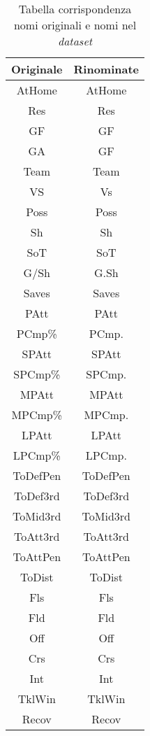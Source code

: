 \begin{table}[!htb]%
	
	\renewcommand{\arraystretch}{1.7}
	\centering
	\begin{tabular}{c c }
		\hline	
		
		\textbf{Originale} & \textbf{Rinominate} \\	
		\hline			
		AtHome & AtHome \\
		Res & Res \\
		GF & GF\\
		GA & GF \\
		Team & Team \\
		VS & Vs\\
		Poss & Poss\\
		Sh & Sh\\
		SoT & SoT\\
		G/Sh & G.Sh \\
		Saves & Saves \\
		PAtt & PAtt \\
		PCmp\% & PCmp.\\
		SPAtt & SPAtt \\
		SPCmp\% & SPCmp.\\
		MPAtt & MPAtt \\
		MPCmp\% & MPCmp.\\
		LPAtt & LPAtt \\
		LPCmp\% & LPCmp. \\
		ToDefPen & ToDefPen \\
		ToDef3rd & ToDef3rd \\
		ToMid3rd & ToMid3rd \\
		ToAtt3rd & ToAtt3rd \\
		ToAttPen & ToAttPen \\
		ToDist & ToDist\\
		Fls & Fls \\
		Fld & Fld \\
		Off & Off \\
		Crs & Crs \\
		Int & Int \\
		TklWin & TklWin \\
		Recov & Recov \\
		\hline
		
	\end{tabular} \hbox{}
	
	\caption{Tabella corrispondenza nomi originali e nomi nel \emph{dataset}} \label{tab:summary2}
\end{table}
